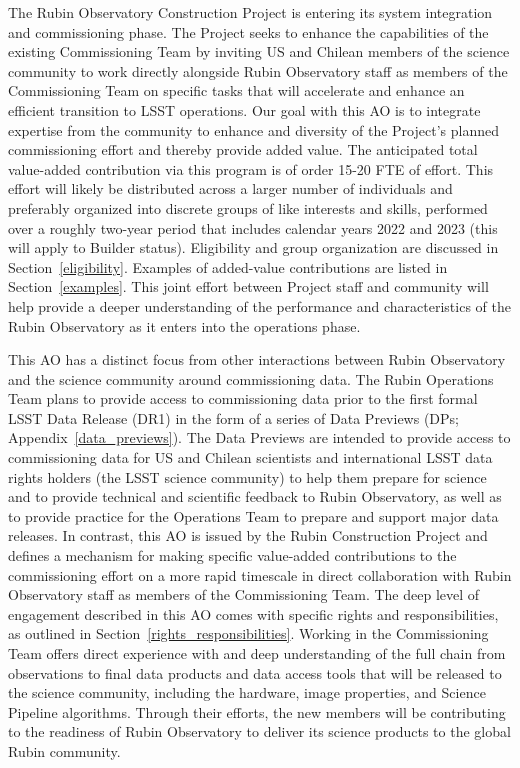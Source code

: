 \documentclass[SE,authoryear,toc,lsstdraft]{lsstdoc}
\begin{document}
The Rubin Observatory Construction Project is entering its system integration and commissioning phase. The Project seeks to enhance the capabilities of the existing Commissioning Team by inviting US and Chilean members of the science community to work directly alongside Rubin Observatory staff as members of the Commissioning Team on specific tasks that will accelerate and enhance an efficient transition to LSST operations. Our goal with this AO is to integrate expertise from the community to enhance and diversity of the Project's planned commissioning effort and thereby provide added value. The anticipated total value-added contribution via this program is of order 15-20 FTE of effort. This effort will likely be distributed across a larger number of individuals and preferably organized into discrete groups of like interests and skills, performed over a roughly two-year period that includes calendar years 2022 and 2023 (this will apply to Builder status). Eligibility and group organization are discussed in Section~\ref{eligibility}. Examples of added-value contributions are listed in Section~\ref{examples}. This joint effort between Project staff and community will help provide a deeper understanding of the performance and characteristics of the Rubin Observatory as it enters into the operations phase.

This AO has a distinct focus from other interactions between Rubin Observatory and the science community around commissioning data. The Rubin Operations Team plans to provide access to commissioning data prior to the first formal LSST Data Release (DR1) in the form of a series of Data Previews (DPs; Appendix~\ref{data_previews}). The Data Previews are intended to provide access to commissioning data for US and Chilean scientists and international LSST data rights holders (the LSST science community) to help them prepare for science and to provide technical and scientific feedback to Rubin Observatory, as well as to provide practice for the Operations Team to prepare and support major data releases. In contrast, this AO is issued by the Rubin Construction Project and defines a mechanism for making specific value-added contributions to the commissioning effort on a more rapid timescale in direct collaboration with Rubin Observatory staff as members of the Commissioning Team. The deep level of engagement described in this AO comes with specific rights and responsibilities, as outlined in Section~\ref{rights_responsibilities}. Working in the Commissioning Team offers direct experience with and deep understanding of the full chain from observations to final data products and data access tools that will be released to the science community, including the hardware, image properties, and Science Pipeline algorithms. Through their efforts, the new members will be contributing to the readiness of Rubin Observatory to deliver its science products to the global Rubin community. 
\end{document}
